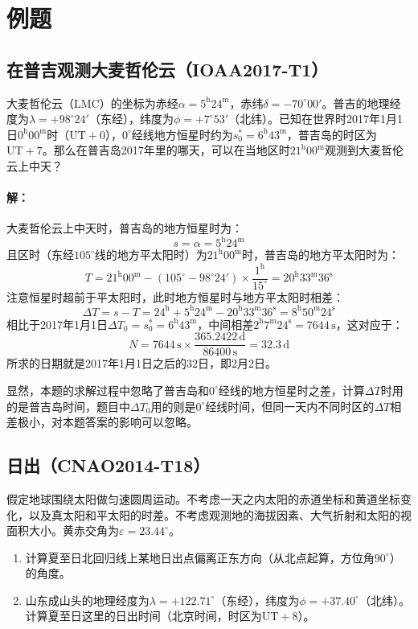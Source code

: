 \documentclass[a4paper]{article}
\renewcommand\epsilon{\varepsilon}
\begin{document}
\newpage
\section{例题}

\subsection{在普吉观测大麦哲伦云（IOAA2017-T1）}

大麦哲伦云（LMC）的坐标为赤经$\alpha = \mathrm{5^h24^m}$，赤纬$\delta = -70^\circ00'$。普吉的地理经度为$\lambda = +98^\circ24'$（东经），纬度为$\phi = +7^\circ53'$（北纬）。已知在世界时2017年1月1日$\mathrm{0^h00^m}$时（$\mathrm{UT+0}$），$0^\circ$经线地方恒星时约为$s_0^* = \mathrm{6^h43^m}$，普吉岛的时区为$\mathrm{UT+7}$。那么在普吉岛2017年里的哪天，可以在当地区时$\mathrm{21^h00^m}$观测到大麦哲伦云上中天？
\bigskip

\paragraph{解：}

大麦哲伦云上中天时，普吉岛的地方恒星时为：
\[
    s = \alpha = \mathrm{5^h24^m}
\]
且区时（东经$105^\circ$线的地方平太阳时）为$\mathrm{21^h00^m}$时，普吉岛的地方平太阳时为：
\[
    T = \mathrm{21^h00^m} - (105^\circ - 98^\circ24') \times \frac{\mathrm{1^h}}{15^\circ} = \mathrm{20^h33^m36^s}
\]
注意恒星时超前于平太阳时，此时地方恒星时与地方平太阳时相差：
\[
    \Delta T = s - T = \mathrm{24^h} + \mathrm{5^h24^m} - \mathrm{20^h33^m36^s} = \mathrm{8^h50^m24^s}
\]
相比于2017年1月1日$\Delta T_0 = s_0^* = \mathrm{6^h43^m}$，中间相差$\mathrm{2^h7^m24^s} = 7644\,\mathrm{s}$，这对应于：
\[
    N = 7644\,\mathrm{s} \times \frac{365.2422\,\mathrm{d}}{86400\,\mathrm{s}} = 32.3\,\mathrm{d}
\]
所求的日期就是2017年1月1日之后的$32$日，即2月2日。

显然，本题的求解过程中忽略了普吉岛和$0^\circ$经线的地方恒星时之差，计算$\Delta T$时用的是普吉岛时间，题目中$\Delta T_0$用的则是$0^\circ$经线时间，但同一天内不同时区的$\Delta T$相差极小，对本题答案的影响可以忽略。

\subsection{日出（CNAO2014-T18）}

假定地球围绕太阳做匀速圆周运动。不考虑一天之内太阳的赤道坐标和黄道坐标变化，以及真太阳和平太阳的时差。不考虑观测地的海拔因素、大气折射和太阳的视面积大小。黄赤交角为$\epsilon = 23.44^\circ$。
\begin{enumerate}
    \item[(1)] 计算夏至日北回归线上某地日出点偏离正东方向（从北点起算，方位角$90^\circ$）的角度。
    \item[(2)] 山东成山头的地理经度为$\lambda = +122.71^\circ$（东经），纬度为$\phi = +37.40^\circ$（北纬）。计算夏至日这里的日出时间（北京时间，时区为$\mathrm{UT+8}$）。
\end{enumerate}
\bigskip
\end{document}

